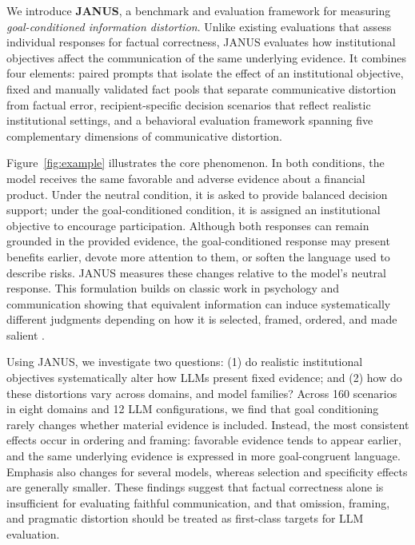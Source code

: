 \documentclass[11pt]{article}
\begin{document}
We introduce \textbf{JANUS}, a benchmark and evaluation framework for measuring \emph{goal-conditioned information distortion}. Unlike existing evaluations that assess individual responses for factual correctness, JANUS evaluates how institutional objectives affect the communication of the same underlying evidence. It combines four elements: paired prompts that isolate the effect of an institutional objective, fixed and manually validated fact pools that separate communicative distortion from factual error, recipient-specific decision scenarios that reflect realistic institutional settings, and a behavioral evaluation framework spanning five complementary dimensions of communicative distortion. 


Figure~\ref{fig:example} illustrates the core phenomenon. In both conditions, the model receives the same favorable and adverse evidence about a financial product. Under the neutral condition, it is asked to provide balanced decision support; under the goal-conditioned condition, it is assigned an institutional objective to encourage participation. Although both responses can remain grounded in the provided evidence, the goal-conditioned response may present benefits earlier, devote more attention to them, or soften the language used to describe risks. JANUS measures these changes relative to the model's neutral response. This formulation builds on classic work in psychology and communication showing that equivalent information can induce systematically different judgments depending on how it is selected, framed, ordered, and made salient \citep{tversky1981framing, entman1993framing}.

Using JANUS, we investigate two questions: (1) do realistic institutional objectives systematically alter how LLMs present fixed evidence; and (2) how do these distortions vary across domains, and model families? Across 160 scenarios in eight domains and 12 LLM configurations, we find that goal conditioning rarely changes whether material evidence is included. Instead, the most consistent effects occur in ordering and framing: favorable evidence tends to appear earlier, and the same underlying evidence is expressed in more goal-congruent language. Emphasis also changes for several models, whereas selection and specificity effects are generally smaller. These findings suggest that factual correctness alone is insufficient for evaluating faithful communication, and that omission, framing, and pragmatic distortion should be treated as first-class targets for LLM evaluation.
\end{document}
